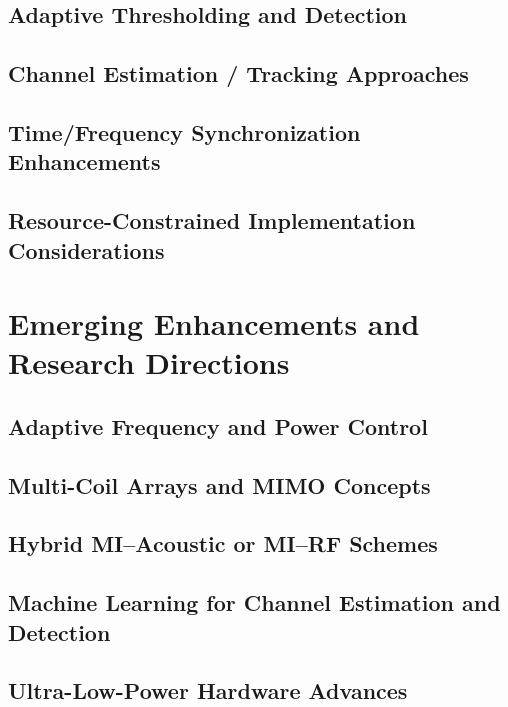 \subsection{Adaptive Thresholding and Detection}\label{subsec:adaptive-detection}

\subsection{Channel Estimation / Tracking Approaches}\label{subsec:channel-estimation}

\subsection{Time/Frequency Synchronization Enhancements}\label{subsec:dsp-synchronization}

\subsection{Resource-Constrained Implementation Considerations}\label{subsec:resource-constraints}

\section{Emerging Enhancements and Research Directions}\label{sec:emerging}
\subsection{Adaptive Frequency and Power Control}\label{subsec:adaptive-frequency}
\subsection{Multi-Coil Arrays and MIMO Concepts}\label{subsec:multi-coil}
\subsection{Hybrid MI--Acoustic or MI--RF Schemes}\label{subsec:hybrid-schemes}
\subsection{Machine Learning for Channel Estimation and Detection}\label{subsec:ml-channel}
\subsection{Ultra-Low-Power Hardware Advances}\label{subsec:ultra-low-power}

